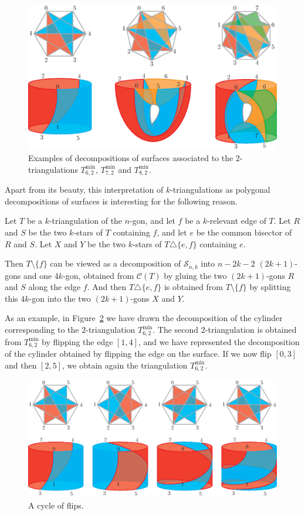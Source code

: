 \documentclass[12pt]{amsart}
\begin{document}
\begin{figure}
\centerline{\includegraphics[scale=.7]{surfaces.eps}}
\caption{\small{Examples of decompositions of surfaces associated to the $2$-triangulations $T_{6,2}^{\min}$, $T_{7,2}^{\min}$ and $T_{8,2}^{\min}$.}}\label{surfaces}
\end{figure}

Apart from its beauty, this interpretation of $k$-triangulations as poly\-gonal decompositions of surfaces is interesting for the following reason.

Let $T$ be a $k$-triangulation of the $n$-gon, and let $f$ be a $k$-relevant edge of $T$. Let $R$ and $S$ be the two $k$-stars of $T$ containing $f$, and let $e$ be the common bisector of $R$ and $S$. Let $X$ and $Y$ be the two $k$-stars of $T\triangle\{e,f\}$ containing $e$.

Then $T\setminus\{f\}$ can be viewed as a decomposition of $\mathcal{S}_{n,k}$ into $n-2k-2$ $(2k+1)$-gons and one $4k$-gon, obtained from $\mathcal{C}(T)$ by gluing the two $(2k+1)$-gons $R$ and $S$ along the edge $f$. And then $T\triangle\{e,f\}$ is obtained from $T\setminus\{f\}$ by splitting this $4k$-gon into the two $(2k+1)$-gons $X$ and $Y$.

As an example, in Figure~\ref{monodromy} we have drawn the decomposition of the cylinder corresponding to the $2$-triangulation $T_{6,2}^{\min}$. The second $2$-triangulation is obtained from $T_{6,2}^{\min}$ by flipping the edge $[1,4]$, and we have represented the decomposition of the cylinder obtained by flipping the edge on the surface. If we now flip $[0,3]$ and then $[2,5]$, we obtain again the triangulation $T_{6,2}^{\min}$. 

\begin{figure}
\centerline{\includegraphics[scale=.7]{monodromy.eps}}
\caption{\small{A cycle of flips.}}\label{monodromy}
\end{figure}
\end{document}
